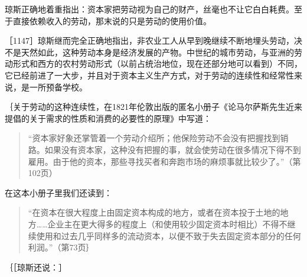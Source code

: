 琼斯正确地着重指出：资本家把劳动视为自己的财产，丝毫也不让它白白耗费。至于直接依赖收入的劳动，那末说的只是劳动的使用价值。

［1147］琼斯继而完全正确地指出，非农业工人从早到晚继续不断地埋头劳动，决不是天然如此，这种劳动本身是经济发展的产物。中世纪的城市劳动，与亚洲的劳动形式和西方的农村劳动形式（以前占统治地位，现在还部分地可以看到）不同，它已经前进了一大步，并且对于资本主义生产方式，对于劳动的连续性和经常性来说，是一所预备学校。

｛关于劳动的这种连续性，在1821年伦敦出版的匿名小册子《论马尔萨斯先生近来提倡的关于需求的性质和消费的必要性的原理》中写道：

\begin{quote}{“资本家好象还掌管着一个劳动介绍所；他保险劳动不会没有把握找到销路。如果没有资本家，这种没有把握的事，就会使劳动在很多情况下得不到雇用。由于他的资本，那些寻找买者和奔跑市场的麻烦事就比较少了。”（第102页）}\end{quote}

在这本小册子里我们还读到：

\begin{quote}{“在资本在很大程度上由固定资本构成的地方，或者在资本投于土地的地方……企业主在更大得多的程度上（和使用较少固定资本时相比）不得不继续使用和过去几乎同样多的流动资本，以便不致于失去固定资本部分的任何利润。”（第73页｝}\end{quote}

｛［琼斯还说：］

